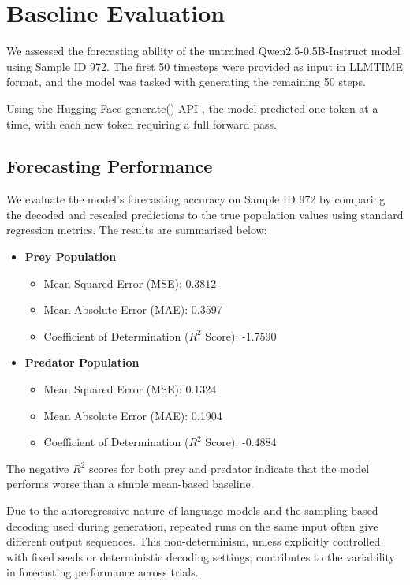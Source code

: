 \documentclass[a4paper,12pt]{article}
\begin{document}
  
\section{Baseline Evaluation}

We assessed the forecasting ability of the untrained Qwen2.5-0.5B-Instruct model \cite{qwen2.5} using Sample ID 972. The first 50 timesteps were provided as input in LLMTIME format, and the model was tasked with generating the remaining 50 steps.

Using the Hugging Face generate() API \cite{huggingface}, the model predicted one token at a time, with each new token requiring a full forward pass.

\subsection*{Forecasting Performance}

We evaluate the model's forecasting accuracy on Sample ID 972 by comparing the decoded and rescaled predictions to the true population values using standard regression metrics. The results are summarised below:

\begin{itemize}
  \item \textbf{Prey Population}
  \begin{itemize}
    \item Mean Squared Error (MSE): 0.3812
    \item Mean Absolute Error (MAE): 0.3597
    \item Coefficient of Determination ($R^2$ Score): -1.7590
  \end{itemize}

  \item \textbf{Predator Population}
  \begin{itemize}
    \item Mean Squared Error (MSE): 0.1324
    \item Mean Absolute Error (MAE): 0.1904
    \item Coefficient of Determination ($R^2$ Score): -0.4884
  \end{itemize}
\end{itemize}

The negative $R^2$ scores for both prey and predator indicate that the model performs worse than a simple mean-based baseline.

  Due to the autoregressive nature of language models and the sampling-based decoding used during generation, repeated runs on the same input often give different output sequences. This non-determinism, unless explicitly controlled with fixed seeds or deterministic decoding settings, contributes to the variability in forecasting performance across trials.
  
\end{document}

